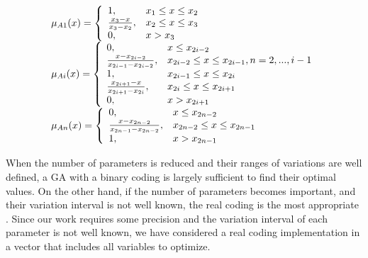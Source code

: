\documentclass[conference]{IEEEtran}
\begin{document}
\begin{equation} 
\begin{tabular}{l}
$\mu_{A1}(x)=  \left \{
\begin{array}{ll}
1, &x_{1} \leq x \leq x_{2}\\
\frac{x_{3} - x}{x_{3} - x_{2}}, &x_{2} \leq x \leq x_{3}\\
0        , &x > x_{3}\\
\end{array} 
\right.$		\\ 	
$\mu_{Ai}(x)= \left \{
\begin{array}{ll} 
0, &x \leq x_{2i-2}\\
\frac{x - x_{2i-2}}{x_{2i-1} - x_{2i-2}}, &x_{2i-2} \leq x \leq x_{2i-1},n=2,...,i-1\\
1, & x_{2i-1} \leq x \leq x_{2i}\\
\frac{x_{2i+1} - x}{x_{2i+1} - x_{2i}},& x_{2i} \leq x \leq x_{2i+1}\\
0  , &x > x_{2i+1}\\
\end{array}  
\right.	$		\\
$\mu_{An}(x)= \left \{
\begin{array}{ll} 
0, &x \leq x_{2n-2}\\
\frac{x - x_{2n-2}}{x_{2n-1} - x_{2n-2}},& x_{2n-2} \leq x \leq x_{2n-1}\\
1 ,& x > x_{2n-1} 
\end{array} 
\right.$\\
\label{eq:e1}
\end{tabular}
\end{equation}


When the number of parameters is reduced and their ranges of variations are well defined, a GA with a binary coding is largely sufficient to find their optimal values. On the other hand, if the number of parameters becomes important, and their variation interval is not well known, the real coding is the most appropriate \cite{elsayed13}. 
Since our work requires some precision and the variation interval of
each parameter is not well known, we have considered a real coding
implementation in a vector that includes all variables to optimize.
\end{document}
